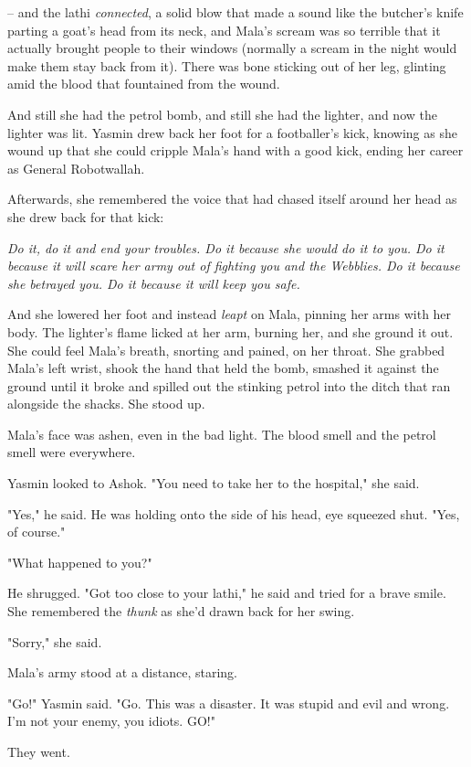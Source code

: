 -- and the lathi \emph{connected}, a solid blow that made a sound
like the butcher's knife parting a goat's head from its neck, and
Mala's scream was so terrible that it actually brought people to
their windows (normally a scream in the night would make them stay
back from it). There was bone sticking out of her leg, glinting
amid the blood that fountained from the wound.

And still she had the petrol bomb, and still she had the lighter,
and now the lighter was lit. Yasmin drew back her foot for a
footballer's kick, knowing as she wound up that she could cripple
Mala's hand with a good kick, ending her career as General
Robotwallah.

Afterwards, she remembered the voice that had chased itself around
her head as she drew back for that kick:

\emph{Do it, do it and end your troubles. Do it because she would do it to you. Do it because it will scare her army out of fighting you and the Webblies. Do it because she betrayed you. Do it because it will keep you safe.}

And she lowered her foot and instead \emph{leapt} on Mala, pinning
her arms with her body. The lighter's flame licked at her arm,
burning her, and she ground it out. She could feel Mala's breath,
snorting and pained, on her throat. She grabbed Mala's left wrist,
shook the hand that held the bomb, smashed it against the ground
until it broke and spilled out the stinking petrol into the ditch
that ran alongside the shacks. She stood up.

Mala's face was ashen, even in the bad light. The blood smell and
the petrol smell were everywhere.

Yasmin looked to Ashok. "You need to take her to the hospital," she
said.

"Yes," he said. He was holding onto the side of his head, eye
squeezed shut. "Yes, of course."

"What happened to you?"

He shrugged. "Got too close to your lathi," he said and tried for a
brave smile. She remembered the \emph{thunk} as she'd drawn back
for her swing.

"Sorry," she said.

Mala's army stood at a distance, staring.

"Go!" Yasmin said. "Go. This was a disaster. It was stupid and evil
and wrong. I'm not your enemy, you idiots. GO!"

They went.

